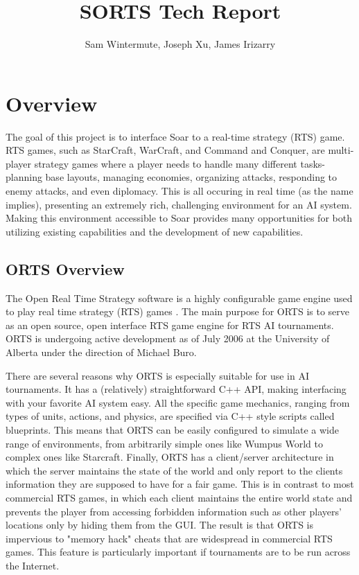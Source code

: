 \documentclass{article}
\title{SORTS Tech Report}
\author{Sam Wintermute, Joseph Xu, James Irizarry}
\begin{document}
\maketitle

\section{Overview}

The goal of this project is to interface Soar to a real-time strategy
(RTS) game. RTS games, such as StarCraft, WarCraft, and Command and
Conquer, are multi-player strategy games where a player needs to handle
many different tasks- planning base layouts, managing economies,
organizing attacks, responding to enemy attacks, and even diplomacy.
This is all occuring in real time (as the name implies), presenting an
extremely rich, challenging environment for an AI system. Making this
environment accessible to Soar provides many opportunities for both
utilizing existing capabilities and the development of new capabilities.

\subsection{ORTS Overview}

The Open Real Time Strategy software is a highly configurable game
engine used to play real time strategy (RTS) games \cite{ORTS}. The main
purpose for ORTS is to serve as an open source, open interface RTS game
engine for RTS AI tournaments. ORTS is undergoing active development as
of July 2006 at the University of Alberta under the direction of Michael
Buro.

There are several reasons why ORTS is especially suitable for use in
AI tournaments. It has a (relatively) straightforward C++ API, making
interfacing with your favorite AI system easy. All the specific game
mechanics, ranging from types of units, actions, and physics, are
specified via C++ style scripts called blueprints. This means that ORTS
can be easily configured to simulate a wide range of environments,
from arbitrarily simple ones like Wumpus World to complex ones like
Starcraft. Finally, ORTS has a client/server architecture in which
the server maintains the state of the world and only report to the
clients information they are supposed to have for a fair game. This
is in contrast to most commercial RTS games, in which each client
maintains the entire world state and prevents the player from accessing
forbidden information such as other players' locations only by hiding
them from the GUI. The result is that ORTS is impervious to "memory
hack" cheats that are widespread in commercial RTS games. This feature
is particularly important if tournaments are to be run across the
Internet.
\end{document}
